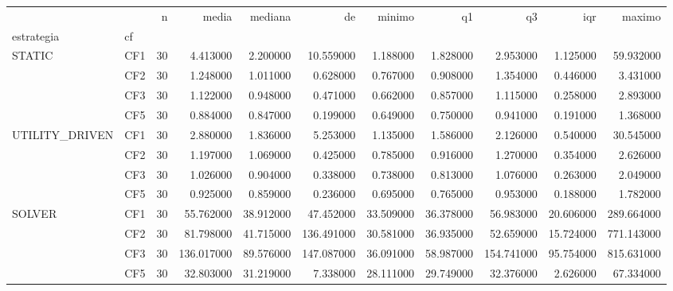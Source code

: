 \begin{tabular}{llrrrrrrrrr}
\toprule
 &  & n & media & mediana & de & minimo & q1 & q3 & iqr & maximo \\
estrategia & cf &  &  &  &  &  &  &  &  &  \\
\midrule
\multirow[t]{4}{*}{STATIC} & CF1 & 30 & 4.413000 & 2.200000 & 10.559000 & 1.188000 & 1.828000 & 2.953000 & 1.125000 & 59.932000 \\
 & CF2 & 30 & 1.248000 & 1.011000 & 0.628000 & 0.767000 & 0.908000 & 1.354000 & 0.446000 & 3.431000 \\
 & CF3 & 30 & 1.122000 & 0.948000 & 0.471000 & 0.662000 & 0.857000 & 1.115000 & 0.258000 & 2.893000 \\
 & CF5 & 30 & 0.884000 & 0.847000 & 0.199000 & 0.649000 & 0.750000 & 0.941000 & 0.191000 & 1.368000 \\
\cline{1-11}
\multirow[t]{4}{*}{UTILITY_DRIVEN} & CF1 & 30 & 2.880000 & 1.836000 & 5.253000 & 1.135000 & 1.586000 & 2.126000 & 0.540000 & 30.545000 \\
 & CF2 & 30 & 1.197000 & 1.069000 & 0.425000 & 0.785000 & 0.916000 & 1.270000 & 0.354000 & 2.626000 \\
 & CF3 & 30 & 1.026000 & 0.904000 & 0.338000 & 0.738000 & 0.813000 & 1.076000 & 0.263000 & 2.049000 \\
 & CF5 & 30 & 0.925000 & 0.859000 & 0.236000 & 0.695000 & 0.765000 & 0.953000 & 0.188000 & 1.782000 \\
\cline{1-11}
\multirow[t]{4}{*}{SOLVER} & CF1 & 30 & 55.762000 & 38.912000 & 47.452000 & 33.509000 & 36.378000 & 56.983000 & 20.606000 & 289.664000 \\
 & CF2 & 30 & 81.798000 & 41.715000 & 136.491000 & 30.581000 & 36.935000 & 52.659000 & 15.724000 & 771.143000 \\
 & CF3 & 30 & 136.017000 & 89.576000 & 147.087000 & 36.091000 & 58.987000 & 154.741000 & 95.754000 & 815.631000 \\
 & CF5 & 30 & 32.803000 & 31.219000 & 7.338000 & 28.111000 & 29.749000 & 32.376000 & 2.626000 & 67.334000 \\
\cline{1-11}
\bottomrule
\end{tabular}

